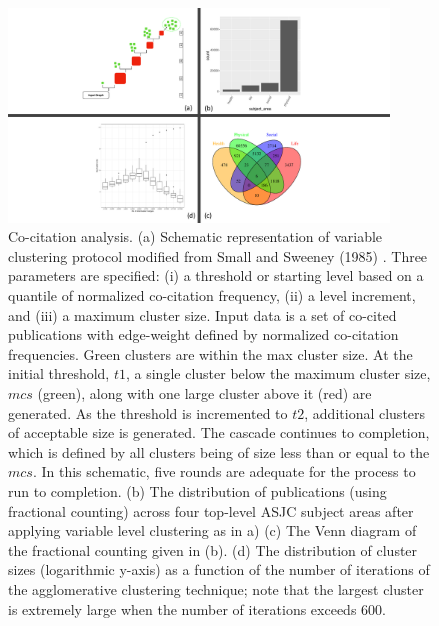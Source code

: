 \begin{figure}[ht]
\centering
\includegraphics[width=0.9\textwidth]{quad-chart-narrow.pdf}
\caption{Co-citation analysis.
(a) Schematic representation of variable clustering protocol modified from Small and Sweeney (1985) \cite{small_clustering_1985}. Three parameters are specified: (i) a threshold or starting level based on a quantile of normalized co-citation frequency, (ii) a level increment, and  (iii) a maximum cluster size. Input data is a set of co-cited publications with edge-weight defined by normalized co-citation frequencies. Green clusters are within the max cluster size. At the initial threshold, $t1$, a single cluster below the maximum cluster size, $mcs$ (green), along with one large cluster above it (red) are generated. As the threshold is incremented to $t2$, additional clusters of acceptable size is generated. The cascade continues to completion, which is defined by all clusters being of size less than or equal to the $mcs$. In this schematic, five rounds are adequate for the process to run to completion.
(b) The distribution of publications (using fractional counting) across four top-level ASJC subject areas after applying variable level clustering as in a)
(c) The Venn diagram of the fractional counting given in (b).
(d) The distribution of cluster sizes (logarithmic y-axis) as a function of the number of iterations of the agglomerative clustering technique; note that the largest cluster is extremely large when the number of iterations exceeds 600.
}
\label{fig:quad-chart}
\end{figure}

\newpage

